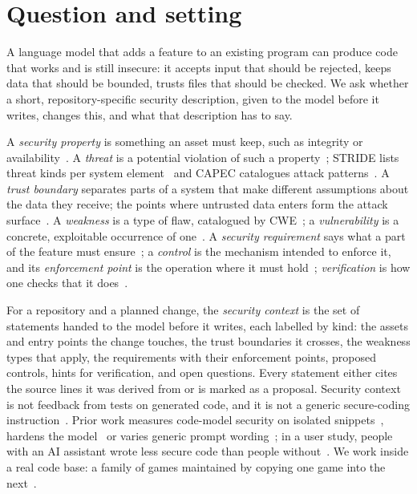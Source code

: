 \section{Question and setting}
\label{sec:setting}

A language model that adds a feature to an existing program can produce
code that works and is still insecure: it accepts input that should be
rejected, keeps data that should be bounded, trusts files that should be
checked. We ask whether a short, repository-specific security description,
given to the model before it writes, changes this, and what that
description has to say.

A \emph{security property} is something an asset must keep, such as
integrity or availability~\citep{avizienis2004,iso25010}. A \emph{threat}
is a potential violation of such a property~\citep{rfc4949}; STRIDE lists
threat kinds per system element~\citep{shostack2014} and CAPEC catalogues
attack patterns~\citep{capec}. A \emph{trust boundary} separates parts of a
system that make different assumptions about the data they receive; the
points where untrusted data enters form the attack
surface~\citep{manadhata2011}. A \emph{weakness} is a type of flaw,
catalogued by CWE~\citep{cwe}; a \emph{vulnerability} is a concrete,
exploitable occurrence of one~\citep{cve}. A \emph{security requirement}
says what a part of the feature must ensure~\citep{haley2008,firesmith2003,sindre2005};
a \emph{control} is the mechanism intended to enforce it, and its
\emph{enforcement point} is the operation where it must
hold~\citep{nist80053,saltzer1975,long2011}; \emph{verification} is how
one checks that it does~\citep{asvs5,nist800218}.

For a repository and a planned change, the \emph{security context} is the
set of statements handed to the model before it writes, each labelled by
kind: the assets and entry points the change touches, the trust boundaries
it crosses, the weakness types that apply, the requirements with their
enforcement points, proposed controls, hints for verification, and open
questions. Every statement either cites the source lines it was derived
from or is marked as a proposal. Security context is not feedback from
tests on generated code, and it is not a generic secure-coding
instruction~\citep{tony2025}. Prior work measures code-model security on
isolated snippets~\citep{pearce2022,siddiq2022,hajipour2024}, hardens the
model~\citep{he2023} or varies generic prompt wording~\citep{tony2025};
in a user study, people with an AI assistant wrote less secure code than
people without~\citep{perry2023}. We work inside a real code base: a
family of games maintained by copying one game into the
next~\citep{krueger2018,dubinsky2013}.

